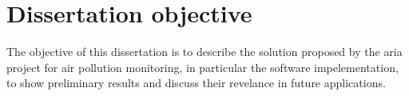 \section{Dissertation objective}
The objective of this dissertation is to describe the solution proposed by the \gls{aria} project for air pollution monitoring, in particular the software impelementation, to show preliminary results and discuss their revelance in future applications.
